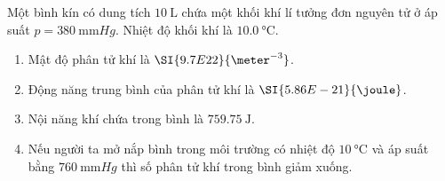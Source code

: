 \begin{ex}
	Một bình kín có dung tích $\SI{10}{\liter}$ chứa một khối khí lí tưởng đơn nguyên tử ở áp suất $p=\SI{380}{\milli\meter Hg}$. Nhiệt độ khối khí là $\SI{10.0}{\celsius}$. 
	\begin{enumerate}[label=\alph*)]
		\item Mật độ phân tử khí là $\SI{9.7E22}{\meter^{-3}}$.
		\item Động năng trung bình của phân tử khí là $\SI{5.86E-21}{\joule}$.
		\item Nội năng khí chứa trong bình là $\SI{759.75}{\joule}$.
		\item Nếu người ta mở nắp bình trong môi trường có nhiệt độ $\SI{10}{\celsius}$ và áp suất bằng $\SI{760}{\milli\meter Hg}$ thì số phân tử khí trong bình giảm xuống.
	\end{enumerate}
	
\end{ex}
